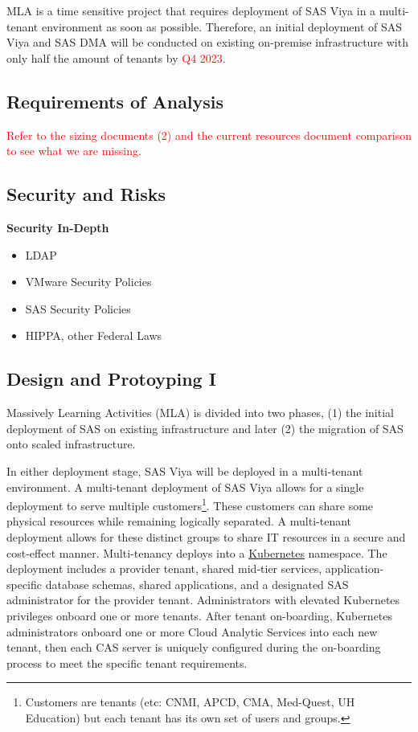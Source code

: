 MLA is a time sensitive project that requires deployment of SAS Viya in a multi-tenant environment as soon as possible. Therefore, an initial deployment of SAS Viya and SAS DMA will be conducted on existing on-premise infrastructure with only half the amount of tenants by \textcolor{red}{Q4 2023}. 

\subsection{Requirements of Analysis}
\textcolor{red}{Refer to the sizing documents (2) and the current resources document comparison to see what we are missing.}

\subsection{Security and Risks}
\textbf{Security In-Depth}
\begin{itemize}
    \item LDAP
    \item VMware Security Policies
    \item SAS Security Policies
    \item HIPPA, other Federal Laws
\end{itemize}

\subsection{Design and Protoyping I}
Massively Learning Activities (MLA) is divided into two phases, (1) the initial deployment of SAS on existing infrastructure and later (2) the migration of SAS onto scaled infrastructure. 

In either deployment stage, SAS Viya will be deployed in a multi-tenant environment. A multi-tenant deployment of SAS Viya allows for a single deployment to serve multiple customers\footnote{Customers are tenants (etc: CNMI, APCD, CMA, Med-Quest, UH Education) but each tenant has its own set of users and groups.}. These customers can share some physical resources while remaining logically separated. A multi-tenant deployment allows for these distinct groups to share IT resources in a secure and cost-effect manner. Multi-tenancy deploys into a \href{https://kubernetes.io/}{Kubernetes} namespace. The deployment includes a provider tenant, shared mid-tier services, application-specific database schemas, shared applications, and a designated SAS administrator for the provider tenant. Administrators with elevated Kubernetes privileges onboard one or more tenants. After tenant on-boarding, Kubernetes administrators onboard one or more Cloud Analytic Services into each new tenant, then each CAS server is uniquely configured during the on-boarding process to meet the specific tenant requirements. 

